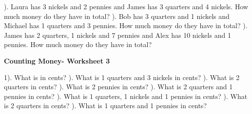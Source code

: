 \documentclass{article}%
\begin{document}
\newline%
\newline%
). Laura has 3 nickels and 2 pennies and James has 3 quarters and 4 nickels. How much money do they have in total?%
\newline%
\newline%
). Bob has 3 quarters and 1 nickels and Michael has 1 quarters and 3 pennies. How much money do they have in total?%
\newline%
\newline%
). James has 2 quarters, 1 nickels and 7 pennies and Alex has 10 nickels and 1 pennies. How much money do they have in total?%
\newline%
\newline%
\newline%
\pagebreak%
\large%
\begin{center}%
\textbf{Counting Money- Worksheet 3}%
\newline%
\end{center} \normalsize%
1). What is  in cents?%
\newline%
\newline%
). What is 1 quarters and 3 nickels in cents?%
\newline%
\newline%
). What is 2 quarters in cents?%
\newline%
\newline%
). What is 2 pennies in cents?%
\newline%
\newline%
). What is 2 quarters and 1 pennies in cents?%
\newline%
\newline%
). What is 1 quarters, 1 nickels and 1 pennies in cents?%
\newline%
\newline%
). What is 2 quarters in cents?%
\newline%
\newline%
). What is 1 quarters and 1 pennies in cents?%
\newline%
\end{document}
